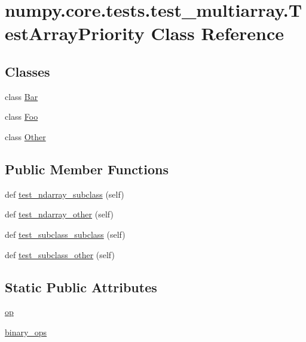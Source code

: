 \hypertarget{classnumpy_1_1core_1_1tests_1_1test__multiarray_1_1TestArrayPriority}{}\section{numpy.\+core.\+tests.\+test\+\_\+multiarray.\+Test\+Array\+Priority Class Reference}
\label{classnumpy_1_1core_1_1tests_1_1test__multiarray_1_1TestArrayPriority}
\subsection*{Classes}
\begin{DoxyCompactItemize}
\item 
class \hyperlink{classnumpy_1_1core_1_1tests_1_1test__multiarray_1_1TestArrayPriority_1_1Bar}{Bar}
\item 
class \hyperlink{classnumpy_1_1core_1_1tests_1_1test__multiarray_1_1TestArrayPriority_1_1Foo}{Foo}
\item 
class \hyperlink{classnumpy_1_1core_1_1tests_1_1test__multiarray_1_1TestArrayPriority_1_1Other}{Other}
\end{DoxyCompactItemize}
\subsection*{Public Member Functions}
\begin{DoxyCompactItemize}
\item 
def \hyperlink{classnumpy_1_1core_1_1tests_1_1test__multiarray_1_1TestArrayPriority_a7f4c9a6b25f0457768f8638fbbfd8dee}{test\+\_\+ndarray\+\_\+subclass} (self)
\item 
def \hyperlink{classnumpy_1_1core_1_1tests_1_1test__multiarray_1_1TestArrayPriority_ae0f58aeb430672282ec5d5d7973bbd25}{test\+\_\+ndarray\+\_\+other} (self)
\item 
def \hyperlink{classnumpy_1_1core_1_1tests_1_1test__multiarray_1_1TestArrayPriority_a6f31529fb5c99ea23a57cdba65684028}{test\+\_\+subclass\+\_\+subclass} (self)
\item 
def \hyperlink{classnumpy_1_1core_1_1tests_1_1test__multiarray_1_1TestArrayPriority_aeaefe22d48fa60d15ce89a892271a730}{test\+\_\+subclass\+\_\+other} (self)
\end{DoxyCompactItemize}
\subsection*{Static Public Attributes}
\begin{DoxyCompactItemize}
\item 
\hyperlink{classnumpy_1_1core_1_1tests_1_1test__multiarray_1_1TestArrayPriority_a0cc6dbb011bc46ec67c7cb894099b022}{op}
\item 
\hyperlink{classnumpy_1_1core_1_1tests_1_1test__multiarray_1_1TestArrayPriority_a5f8baf4809cc03e8bf78a2919f9fb659}{binary\+\_\+ops}
\end{DoxyCompactItemize}


